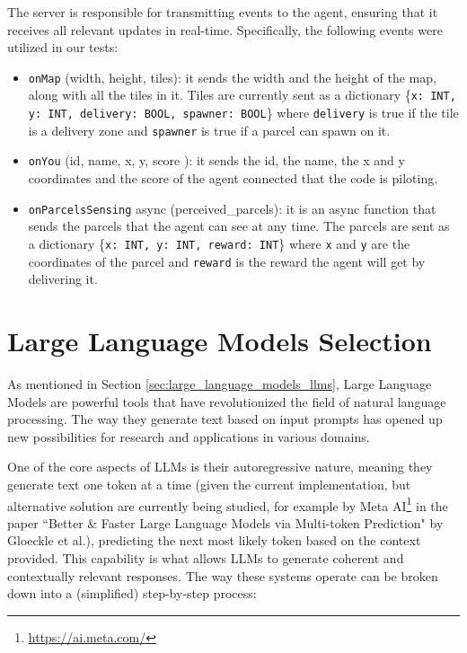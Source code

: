 The server is responsible for transmitting events to the agent, ensuring that it
receives all relevant updates in real-time. Specifically, the following events
were utilized in our tests:

\begin{itemize}
  \item \texttt{onMap} (width, height, tiles): it sends the width and the height
    of the map, along with all the tiles in it. Tiles are currently sent as a dictionary
    \{\texttt{x: INT, y: INT, delivery: BOOL, spawner: BOOL}\} where \texttt{delivery}
    is true if the tile is a delivery zone and \texttt{spawner} is true if a
    parcel can spawn on it.

  \item \texttt{onYou} (id, name, x, y, score ): it sends the id, the name, the
    x and y coordinates and the score of the agent connected that the code is
    piloting.

  \item \texttt{onParcelsSensing} async (perceived\_parcels): it is an async function
    that sends the parcels that the agent can see at any time. The parcels are
    sent as a dictionary \{\texttt{x: INT, y: INT, reward: INT}\} where \texttt{x}
    and \texttt{y} are the coordinates of the parcel and \texttt{reward} is the
    reward the agent will get by delivering it.
\end{itemize}

\section{Large Language Models Selection}
\label{sec:llm_models}

As mentioned in Section \ref{sec:large_language_models_llms}, Large Language Models
are powerful tools that have revolutionized the field of natural language processing.
The way they generate text based on input prompts has opened up new
possibilities for research and applications in various domains.

One of the core aspects of LLMs is their autoregressive nature, meaning they generate
text one token at a time (given the current implementation, but alternative solution
are currently being studied, for example by Meta AI\footnote{\url{https://ai.meta.com/}}
in the paper ``Better \& Faster Large Language Models via Multi-token Prediction"
by Gloeckle et al.\cite{gloeckle2024betterfasterlarge}), predicting the next
most likely token based on the context provided. This capability is what allows LLMs
to generate coherent and contextually relevant responses. The way these systems
operate can be broken down into a (simplified) step-by-step process:

